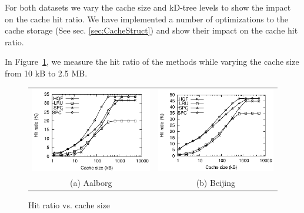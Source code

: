 For both datasets we vary the cache size and kD-tree levels to show the impact on the cache hit ratio. We have implemented a number of optimizations to the cache storage (See sec. \ref{sec:CacheStruct}) and show their impact on the cache hit ratio.


%
In Figure~\ref{fig:cSizeVsHitRatio}, we measure the hit ratio of the methods
while varying the cache size from 10 kB to 2.5 MB.


\begin{figure}[htb]
\center
  \begin{tabular}{@{}c@{ }c@{}}
     \includegraphics[width=0.5\columnwidth]{figures/cachesize_hitratio_aal.pdf}
     &
     \includegraphics[width=0.5\columnwidth]{figures/cachesize_hitratio_bei.pdf}
      \\
     (a) Aalborg & (b)  Beijing
     \end{tabular}
\caption{Hit ratio vs. cache size }
\label{fig:cSizeVsHitRatio}
\end{figure}

